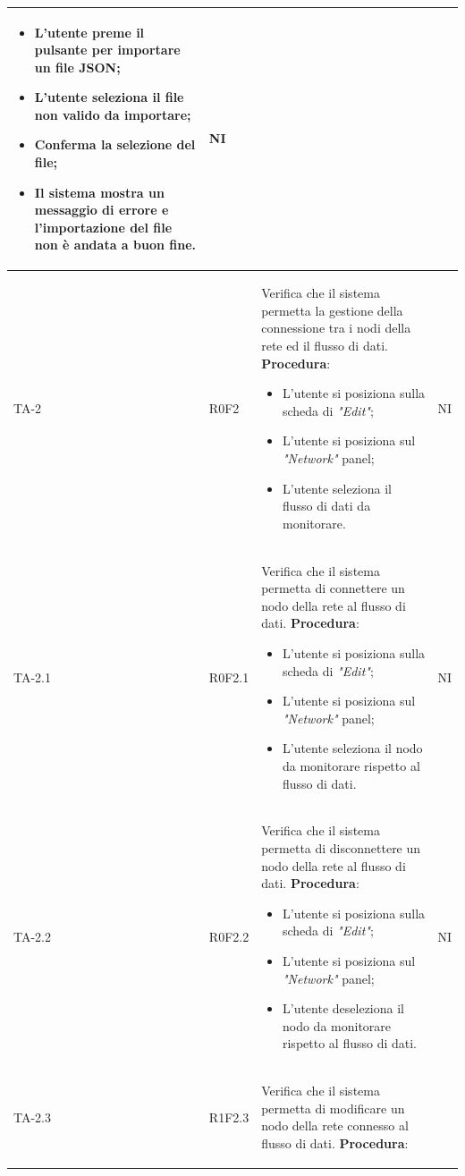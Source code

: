 \begin{longtable}{|C{2.5cm}|C{2.5cm}|L{6.5cm}|C{1.5cm}|}
\begin{itemize}
		\item L'utente preme il pulsante per importare un file JSON;
		\item L'utente seleziona il file non valido da importare;
		\item Conferma la selezione del file;
		\item Il sistema mostra un messaggio di errore e l'importazione del file non è andata a buon fine.
	\end{itemize}
	 & {NI}\\
	\hline
	{TA-2} & {R0F2} & 
	Verifica che il sistema permetta la gestione della connessione tra i nodi della rete ed il flusso di dati.
	\textbf{Procedura}:
	\begin{itemize}		
		\item L'utente si posiziona sulla scheda di \emph{"Edit"};
		\item L'utente si posiziona sul \emph{"Network"} panel;
		\item L'utente seleziona il flusso di dati da monitorare.
	\end{itemize}
	 & {NI}\\
	\hline
	{TA-2.1} & {R0F2.1} & 
	Verifica che il sistema permetta di connettere un nodo della rete al flusso di dati.
	\textbf{Procedura}:
	\begin{itemize}		
		\item L'utente si posiziona sulla scheda di \emph{"Edit"};
		\item L'utente si posiziona sul \emph{"Network"} panel;
		\item L'utente seleziona il nodo da monitorare rispetto al flusso di dati.
	\end{itemize}
	 & {NI}\\
	\hline
	{TA-2.2} & {R0F2.2} & 
	Verifica che il sistema permetta di disconnettere un nodo della rete al flusso di dati.
	\textbf{Procedura}:
	\begin{itemize}		
		\item L'utente si posiziona sulla scheda di \emph{"Edit"};
		\item L'utente si posiziona sul \emph{"Network"} panel;
		\item L'utente deseleziona il nodo da monitorare rispetto al flusso di dati.
	\end{itemize}
	 & {NI}\\
	\hline
	{TA-2.3} & {R1F2.3} & 
	Verifica che il sistema permetta di modificare un nodo della rete connesso al flusso di dati.
	\textbf{Procedura}:
	\begin{itemize}		

\end{itemize}
\end{longtable}
